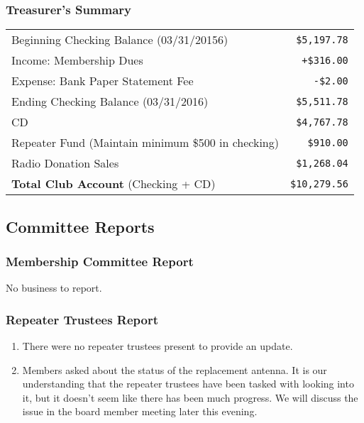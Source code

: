 \documentclass[10pt,letterpaper]{article}
\begin{document}
\subsubsection{Treasurer's Summary}
\noindent
\begin{tabular}{|l|r|}
  \hline
  Beginning Checking Balance (03/31/20156) & \texttt{\$5,197.78} \\
  Income: Membership Dues & \texttt{+\$316.00} \\
  Expense: Bank Paper Statement Fee & \texttt{-\$2.00} \\
  Ending Checking Balance (03/31/2016) & \texttt{\$5,511.78} \\
  \hline
  \hline
  CD & \texttt{\$4,767.78} \\
  \hline
  \hline
  Repeater Fund (Maintain minimum \$500 in checking) & \texttt{\$910.00} \\
  \hline
  \hline
  Radio Donation Sales & \texttt{\$1,268.04} \\
  \hline
  \hline
  \textbf{Total Club Account} (Checking + CD) & \texttt{\$10,279.56} \\
  \hline
\end{tabular}


\subsection{Committee Reports}

\subsubsection{Membership Committee Report}

No business to report.

\subsubsection{Repeater Trustees Report}

\begin{enumerate}
\item There were no repeater trustees present to provide an update.
\item Members asked about the status of the replacement antenna. It is our understanding that the repeater trustees have been tasked with looking into it, but it doesn't seem like there has been much progress. We will discuss the issue in the board member meeting later this evening.
\end{enumerate}
\end{document}
